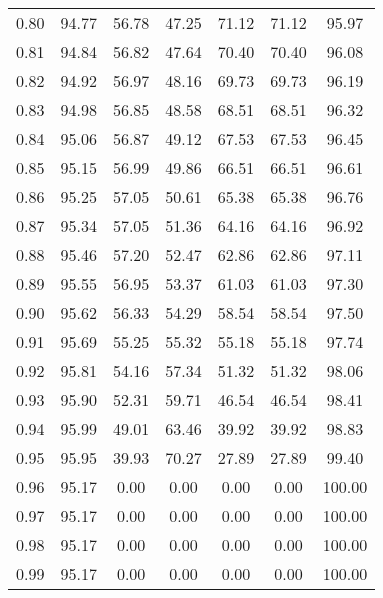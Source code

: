 \begin{tabular}{|c|c|c|c|c|c|c|}
      0.80 &     94.77 &     56.78 &      47.25 &   71.12 &      71.12 &         95.97 \\
      0.81 &     94.84 &     56.82 &      47.64 &   70.40 &      70.40 &         96.08 \\
      0.82 &     94.92 &     56.97 &      48.16 &   69.73 &      69.73 &         96.19 \\
      0.83 &     94.98 &     56.85 &      48.58 &   68.51 &      68.51 &         96.32 \\
      0.84 &     95.06 &     56.87 &      49.12 &   67.53 &      67.53 &         96.45 \\
      0.85 &     95.15 &     56.99 &      49.86 &   66.51 &      66.51 &         96.61 \\
      0.86 &     95.25 &     57.05 &      50.61 &   65.38 &      65.38 &         96.76 \\
      0.87 &     95.34 &     57.05 &      51.36 &   64.16 &      64.16 &         96.92 \\
      0.88 &     95.46 &     57.20 &      52.47 &   62.86 &      62.86 &         97.11 \\
      0.89 &     95.55 &     56.95 &      53.37 &   61.03 &      61.03 &         97.30 \\
      0.90 &     95.62 &     56.33 &      54.29 &   58.54 &      58.54 &         97.50 \\
      0.91 &     95.69 &     55.25 &      55.32 &   55.18 &      55.18 &         97.74 \\
      0.92 &     95.81 &     54.16 &      57.34 &   51.32 &      51.32 &         98.06 \\
      0.93 &     95.90 &     52.31 &      59.71 &   46.54 &      46.54 &         98.41 \\
      0.94 &     95.99 &     49.01 &      63.46 &   39.92 &      39.92 &         98.83 \\
      0.95 &     95.95 &     39.93 &      70.27 &   27.89 &      27.89 &         99.40 \\
      0.96 &     95.17 &      0.00 &       0.00 &    0.00 &       0.00 &        100.00 \\
      0.97 &     95.17 &      0.00 &       0.00 &    0.00 &       0.00 &        100.00 \\
      0.98 &     95.17 &      0.00 &       0.00 &    0.00 &       0.00 &        100.00 \\
      0.99 &     95.17 &      0.00 &       0.00 &    0.00 &       0.00 &        100.00 \\
\bottomrule
\end{tabular}
